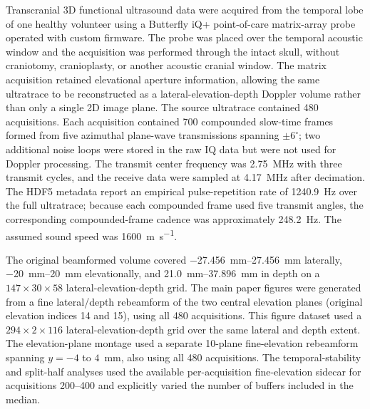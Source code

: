 \documentclass[11pt]{article}
\begin{document}
Transcranial 3D functional ultrasound data were acquired from the
temporal lobe of one healthy volunteer using a Butterfly iQ+
point-of-care matrix-array probe operated with custom firmware.  The
probe was placed over the temporal acoustic window and the acquisition
was performed through the intact skull, without craniotomy,
cranioplasty, or another acoustic cranial window.  The matrix
acquisition retained elevational aperture information, allowing the
same ultratrace to be reconstructed as a lateral-elevation-depth
Doppler volume rather than only a single 2D image plane.  The source
ultratrace contained 480 acquisitions.  Each acquisition contained 700
compounded slow-time frames formed from five azimuthal plane-wave
transmissions spanning $\pm 6^\circ$; two additional noise loops were
stored in the raw IQ data but were not used for Doppler processing.
The transmit center frequency was \SI{2.75}{\mega\hertz} with three
transmit cycles, and the receive data were sampled at
\SI{4.17}{\mega\hertz} after decimation.  The HDF5 metadata report an
empirical pulse-repetition rate of \SI{1240.9}{\hertz} over the full
ultratrace; because each compounded frame used five transmit angles,
the corresponding compounded-frame cadence was approximately
\SI{248.2}{\hertz}.  The assumed sound speed was
\SI{1600}{\meter\per\second}.

The original beamformed volume covered
\SIrange{-27.456}{27.456}{\milli\meter} laterally,
\SIrange{-20}{20}{\milli\meter} elevationally, and
\SIrange{21.0}{37.896}{\milli\meter} in depth on a
$147 \times 30 \times 58$ lateral-elevation-depth grid.  The main
paper figures were generated from a fine lateral/depth rebeamform of
the two central elevation planes (original elevation indices 14 and
15), using all 480 acquisitions.  This figure dataset used a
$294 \times 2 \times 116$ lateral-elevation-depth grid over the same
lateral and depth extent.  The elevation-plane montage used a separate
10-plane fine-elevation rebeamform spanning $y=-4$ to $4$~mm, also
using all 480 acquisitions.  The temporal-stability and split-half
analyses used the available per-acquisition fine-elevation sidecar for
acquisitions 200--400 and explicitly varied the number of buffers
included in the median.
\end{document}
